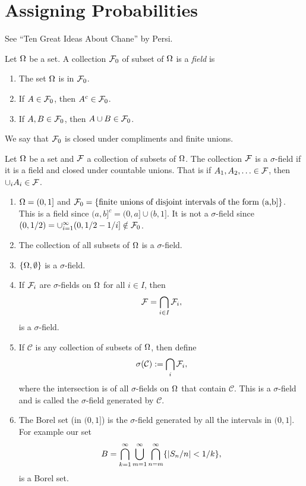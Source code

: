 \section{Assigning Probabilities}
See ``Ten Great Ideas About Chane'' by Persi. 
\begin{defn}
    Let ${{\Omega}}$ be a set. A collection ${\mathcal{F}}_0$ of subset of ${{\Omega}}$ is a \emph{field} is
    \begin{enumerate}
        \item The set ${{\Omega}}$ is in ${\mathcal{F}}_0$.
        \item If $A \in {\mathcal{F}}_0$, then $A^c \in {\mathcal{F}}_0$.
        \item If $A, B \in {\mathcal{F}}_0$, then $A \cup B \in {\mathcal{F}}_0$.
    \end{enumerate}
\end{defn}
We say that ${\mathcal{F}}_0$ is closed under compliments and finite unions.
\begin{defn}
    Let ${{\Omega}}$ be a set and ${\mathcal{F}}$ a collection of subsets of ${{\Omega}}$. The collection ${\mathcal{F}}$ is a $\sigma$-field if it is a field and closed under countable unions. That is if $A_1,A_2,\ldots \in {\mathcal{F}}$, then $\cup_i A_i \in {\mathcal{F}}$.
\end{defn}
\begin{exs}
\begin{enumerate}
    \item ${{\Omega}} = (0,1]$ and ${\mathcal{F}}_0 = \{\text{finite unions of disjoint intervals of the form (a,b]}\}$. This is a field since $(a,b]^c = (0,a] \cup (b,1]$. It is not a $\sigma$-field since $(0,1/2) = \cup_{i=1}^\infty (0,1/2-1/i] \notin {\mathcal{F}}_0$.
    \item The collection of all subsets of ${{\Omega}}$ is a $\sigma$-field.
    \item $\{{{\Omega}}, \emptyset\}$ is a $\sigma$-field.
    \item If ${\mathcal{F}}_i$ are $\sigma$-fields on ${{\Omega}}$ for all $i \in I$, then 
    \[{\mathcal{F}} = \bigcap_{i \in I}{\mathcal{F}}_i, \]
    is a $\sigma$-field.
    \item If $\mathcal{C}$ is any collection of subsets of ${{\Omega}}$, then define
     \[\sigma(\mathcal{C}) := \bigcap_{i} {\mathcal{F}}_i,\]
    where the intersection is of all $\sigma$-fields on ${{\Omega}}$ that contain $\mathcal{C}$. This is a $\sigma$-field and is called the $\sigma$-field generated by $\mathcal{C}$.
    \item The Borel set (in $(0,1]$) is the $\sigma$-field generated by all the intervals in $(0,1]$. For example our set
    \[B = \bigcap_{k=1}^\infty \bigcup_{m=1}^\infty \bigcap_{n = m}^\infty \{{\left\lvert S_n/n\right\rvert} < 1/k \},\]
    is a Borel set.
\end{enumerate}
\end{exs}
